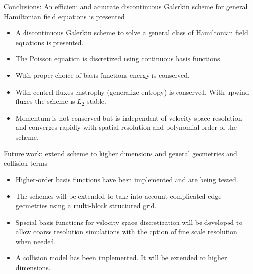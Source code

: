 \documentclass[pdf]{beamer}
\theoremstyle{definition}
\begin{document}
\begin{frame}{Conclusions: An efficient and accurate discontinuous
    Galerkin scheme for general Hamiltonian field equations is
    presented}%

  \begin{itemize}
  \item A discontinuous Galerkin scheme to solve a general class of
    Hamiltonian field equations is presented.
  \item The Poisson equation is discretized using continuous basis
    functions.
  \item With proper choice of basis functions energy is
    conserved. 
  \item With central fluxes enstrophy (generalize entropy) is
    conserved. With upwind fluxes the scheme is $L_2$ stable.
  \item Momentum is not conserved but is independent of velocity space
    resolution and converges rapidly with spatial resolution and
    polynomial order of the scheme.
  \end{itemize}

\end{frame}

\begin{frame}{Future work: extend scheme to higher dimensions and
    general geometries and collision terms}%

  \begin{itemize}
  \item Higher-order basis functions have been implemented and are
    being tested.
  \item The schemes will be extended to take into account complicated
    edge geometries using a multi-block structured grid.
  \item Special basis functions for velocity space discretization will
    be developed to allow coarse resolution simulations with the
    option of fine scale resolution when needed.
  \item A collision model has been implemented. It will be extended to
    higher dimensions.
  \end{itemize}

\end{frame}
\end{document}
